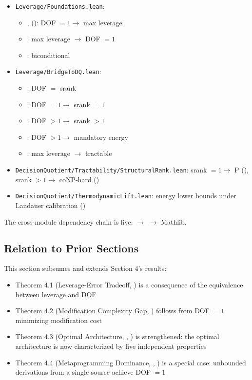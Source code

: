 \begin{itemize}
\item \nolinkurl{Leverage/Foundations.lean}:
  \begin{itemize}
  \item {},  (): DOF $= 1 \to$ max leverage
  \item {}: max leverage $\to$ DOF $= 1$
  \item {}: biconditional
  \end{itemize}
\item \nolinkurl{Leverage/BridgeToDQ.lean}:
  \begin{itemize}
  \item {}: DOF $=$ srank
  \item {}: DOF $= 1 \to$ srank $= 1$
  \item {}: DOF $> 1 \to$ srank $> 1$
  \item {}: DOF $> 1 \to$ mandatory energy
  \item {}: max leverage $\to$ tractable
  \end{itemize}
\item \nolinkurl{DecisionQuotient/Tractability/StructuralRank.lean}: srank $= 1 \to$ P (), srank $> 1 \to$ coNP-hard ()
\item \nolinkurl{DecisionQuotient/ThermodynamicLift.lean}: energy lower bounds under Landauer calibration ()
\end{itemize}

The cross-module dependency chain is live:  $\to$  $\to$ Mathlib.

\subsection{Relation to Prior Sections}

This section subsumes and extends Section 4's results:
\begin{itemize}
\item Theorem 4.1 (Leverage-Error Tradeoff, ) is a consequence of the equivalence between leverage and DOF
\item Theorem 4.2 (Modification Complexity Gap, ) follows from DOF $= 1$ minimizing modification cost
\item Theorem 4.3 (Optimal Architecture, , ) is strengthened: the optimal architecture is now characterized by five independent properties
\item Theorem 4.4 (Metaprogramming Dominance, , ) is a special case: unbounded derivations from a single source achieve DOF $= 1$
\end{itemize}

